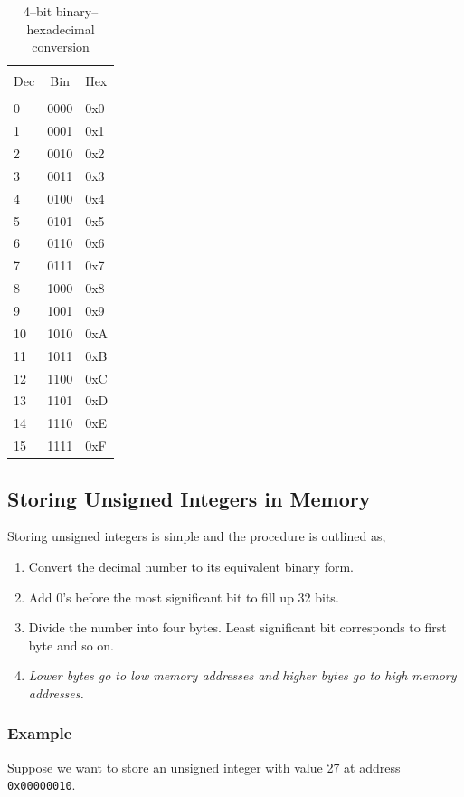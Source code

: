 \documentclass{article}
\begin{document}
\begin{table}[H]
\centering
\label{4-bit-bin-hex-table}
	\begin{tabular}{l c l}
	\hline \hline \\ [-2ex]
	Dec & Bin & Hex\\
	\hline \\ [-2ex]
	0  & 0000 & 0x0\\
	1  & 0001 & 0x1\\
	2  & 0010 & 0x2\\
	3  & 0011 & 0x3\\
	4  & 0100 & 0x4\\
	5  & 0101 & 0x5\\
	6  & 0110 & 0x6\\
	7  & 0111 & 0x7\\
	8  & 1000 & 0x8\\
	9  & 1001 & 0x9\\
	10 & 1010 & 0xA\\
	11 & 1011 & 0xB\\
	12 & 1100 & 0xC\\
	13 & 1101 & 0xD\\
	14 & 1110 & 0xE\\
	15 & 1111 & 0xF\\
	\hline \hline
	\end{tabular}
\caption{4--bit binary--hexadecimal conversion}
\end{table}

\subsection{Storing Unsigned Integers in Memory}
Storing unsigned integers is simple and the procedure is outlined as,
\begin{enumerate}
\item Convert the decimal number to its equivalent binary form.
\item Add 0's before the most significant bit to fill up 32 bits\footnotemark.
\item Divide the number into four bytes. Least significant bit corresponds to first byte and so on.
\item \emph{Lower bytes go to low memory addresses and higher bytes go to high memory addresses.}
\end{enumerate}

\subsubsection{Example}
Suppose we want to store an unsigned integer with value 27 at address \verb|0x00000010|.
\end{document}

